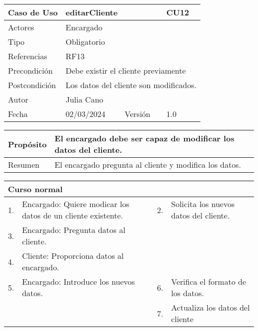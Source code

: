 \newpage


\begin{table}[H]
	\centering
	\begin{tabular}{| m{} | m{} | m{} | m{}|}
		\hline
		\rowcolor{grayshade} Caso de Uso & \multicolumn{2}{|m{0.43\textwidth}|}{editarCliente} &  CU12\\ 
		\hline
		Actores & \multicolumn{3}{l|}{Encargado} \\ 
		\hline
		Tipo & \multicolumn{3}{l|}{Obligatorio} \\ 
		\hline
		Referencias & \multicolumn{3}{l|}{RF13} \\ 
		\hline
		Precondición & \multicolumn{3}{m{0.67\textwidth}|}{Debe existir el cliente previamente} \\ 
		\hline
		Postcondición & \multicolumn{3}{m{0.67\textwidth}|}{Los datos del cliente son modificados.} \\ 
		\hline
		Autor & \multicolumn{3}{l|}{Julia Cano} \\ 
		\hline
		Fecha & 02/03/2024 & Versión & 1.0 \\
		\hline
	\end{tabular}
\end{table}

\begin{table}[H]
	\centering
	\begin{tabular}{| m{} | m{} | m{} | m{} |}
		\hline
		Propósito & \multicolumn{3}{m{0.67\textwidth}|}{El encargado debe ser capaz de modificar los datos del cliente.}  \\ 
		\hline
		Resumen & \multicolumn{3}{m{0.67\textwidth}|}{El encargado pregunta al cliente y modifica los datos.} \\ 
		\hline
	\end{tabular}
\end{table}


\begin{table}[H]
	\centering
	\begin{tabular}{| m{} | m{} | m{} | m{} |}
		\hline
		\multicolumn{4}{|m{0.9\textwidth}|}{Curso normal}     \\ 
		\hline
		1. & Encargado: Quiere modicar los datos de un cliente existente. & 2. &  Solicita los nuevos datos del cliente.  \\ 
		\hline
		3. & Encargado: Pregunta datos al cliente. &  &   \\ 
		\hline
		4. & Cliente: Proporciona datos al encargado. &  &   \\ 
		\hline
		5. & Encargado: Introduce los nuevos datos. & 6. & Verifica el formato de los datos. \\ 
		\hline
		&  & 7. & Actualiza los datos del cliente \\ 
		\hline
	\end{tabular}
\end{table}

